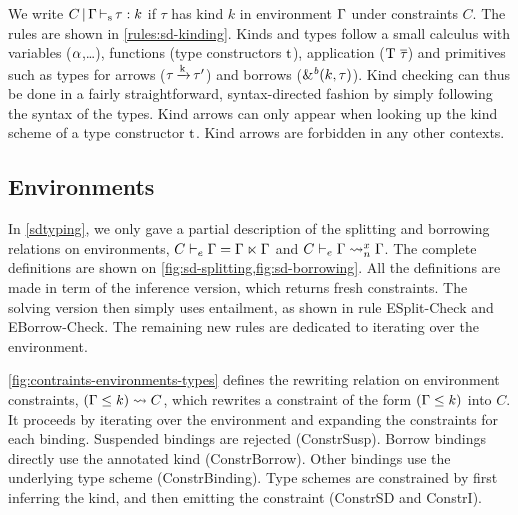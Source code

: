 We write $C \operatorname{|} \Gamma \operatorname{\vdash_s} \tau : k$
if $\tau$ has kind $k$ in environment $\Gamma$ under constraints $C$.
The rules are shown in \cref{rules:sd-kinding}.
Kinds and types follow a small calculus with variables ($\alpha$,\dots),
functions (type constructors $\mathrm{t}$), application ($\mathrm{\mathrm{T}}\ \overline{\tau_{{}}}$)
and primitives such as types for arrows ($\tau\operatorname{\xrightarrow{k}}\tau'$) and
borrows (${\&}^{\textit{b}}(k,\tau)$).
Kind checking can thus be done in a fairly straightforward, syntax-directed
fashion by simply following
the syntax of the types. Kind arrows can only appear when looking
up the kind scheme of a type constructor $\mathrm{t}$. Kind arrows are forbidden
in any other contexts.

\subsection{Environments}
\label{typ:extra:envs}

In \cref{sdtyping}, we only gave a partial description of
the splitting and borrowing relations on environments,
$C \vdash_e \Gamma = \Gamma \ltimes \Gamma$ and $C \vdash_e \Gamma \rightsquigarrow_{n}^{x} \Gamma$.
The complete definitions are shown on \cref{fig:sd-splitting,fig:sd-borrowing}.
All the definitions are made in term of the inference version, which
returns fresh constraints. The solving version then simply
uses entailment, as shown in rule {\sc ESplit-Check} and
{\sc EBorrow-Check}.
The remaining new rules are dedicated to iterating over the environment.

\cref{fig:contraints-environments-types} defines
the rewriting relation on environment constraints,
$(\Gamma \leq k) \leadsto C$, which rewrites a constraint of the form
$(\Gamma \leq k)$ into $C$. It proceeds by iterating over the environment
and expanding the constraints for each binding.
Suspended bindings are rejected ({\sc ConstrSusp}).
Borrow bindings directly use the annotated kind ({\sc ConstrBorrow}).
Other bindings use the underlying type scheme ({\sc ConstrBinding}).
Type schemes are constrained by first inferring the kind, and then
emitting the constraint ({\sc ConstrSD} and {\sc ConstrI}).


\begin{figure*}[!tb]
  
  \caption{Splitting ---
    environments $\lsplit C\E{\E_l}{\E_r}$;
    inference $\bsplit C\E{\inP{\E_l}}{\inP{\E_r}}$;
    binders $\bsplit Cb{\inP{b_r}}{\inP{b_l}}$}
  \label{fig:sd-splitting}
  
  \caption{Borrowing ---
    environments $\lregion[n]{C}{x}{\E}{\E'}$;
    inference $\bregion[\inP n]{C}{\inP x}{\E}{\inP{\E'}}$;
    binders $\bregion[\inP n]{C}{\inP x}{b}{\inP{b'}}$}
  \label{fig:sd-borrowing}
  
  \caption{Rewriting constraints on environments --- $\inP{\Cleq{\E}{k}}\Crewrite  C$}
  \label{fig:contraints-environments-types}
\end{figure*}

